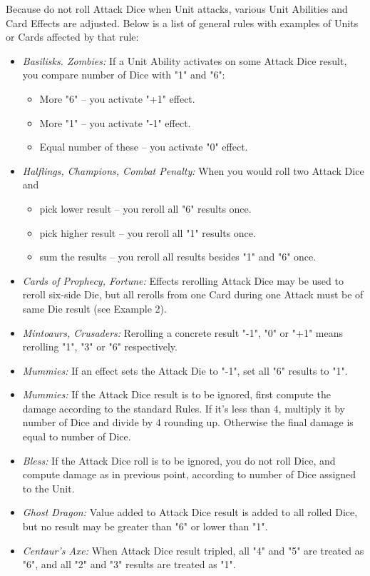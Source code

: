 \begin{multicols*}{2}
    Because do not roll Attack Dice when Unit attacks, various Unit Abilities and Card Effects are adjusted. Below is a list of general rules with examples of Units or Cards affected by that rule:
    \begin{itemize}
        \item \textit{Basilisks. Zombies:} If a Unit Ability activates on some Attack Dice result, you compare number of Dice with "1" and "6": \begin{itemize}
            \item More "6" -- you activate "+1" effect.
            \item More "1" -- you activate "-1" effect.
            \item Equal number of these -- you activate "0" effect.
        \end{itemize}
        \item \textit{Halflings, Champions, Combat Penalty:} When you would roll two Attack Dice and \begin{itemize}
            \item pick lower result -- you reroll all "6" results once.
            \item pick higher result -- you reroll all "1" results once.
            \item sum the results -- you reroll all results besides "1" and "6" once.
        \end{itemize} 
        \item \textit{Cards of Prophecy, Fortune:} Effects rerolling Attack Dice may be used to reroll six-side Die, but all rerolls from one Card during one Attack must be of same Die result (see Example 2).
        \item \textit{Mintoaurs, Crusaders:} Rerolling a concrete result "-1", "0" or "+1" means rerolling "1", "3" or "6" respectively.
        \item \textit{Mummies:} If an effect sets the Attack Die to "-1", set all "6" results to "1".
        \item \textit{Mummies:} If the Attack Dice result is to be ignored, first compute the damage according to the standard Rules. If it's less than 4, multiply it by number of Dice and divide by 4 rounding up. Otherwise the final damage is equal to number of Dice.
        \item \textit{Bless:} If the Attack Dice roll is to be ignored, you do not roll Dice, and compute damage as in previous point, according to number of Dice assigned to the Unit.
        \item \textit{Ghost Dragon:} Value added to Attack Dice result is added to all rolled Dice, but no result may be greater than "6" or lower than "1".
        \item \textit{Centaur's Axe:} When Attack Dice result tripled, all "4" and "5" are treated as "6", and all "2" and "3" results are treated as "1".
    \end{itemize}
    

\end{multicols*}

